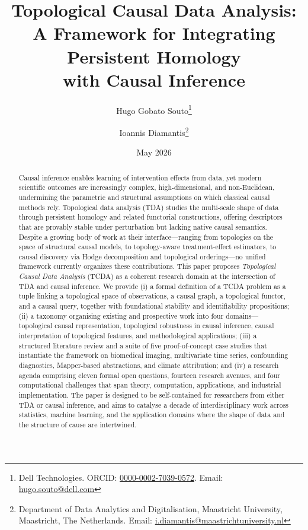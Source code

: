 \documentclass[11pt,a4paper]{article}
\title{\textbf{Topological Causal Data Analysis:\\
A Framework for Integrating Persistent Homology\\
with Causal Inference}}
\author{Hugo Gobato Souto\thanks{Dell Technologies. ORCID: \href{https://orcid.org/0000-0002-7039-0572}{0000-0002-7039-0572}. Email: \href{mailto:hugo.souto@dell.com}{hugo.souto@dell.com}} \and Ioannis Diamantis\thanks{Department of Data Analytics and Digitalisation, Maastricht University, Maastricht, The Netherlands. Email: \href{mailto:i.diamantis@maastrichtuniversity.nl}{i.diamantis@maastrichtuniversity.nl}}}
\date{May 2026}
\theoremstyle{definition}
\begin{document}
\maketitle

\begin{abstract}
Causal inference enables learning of intervention effects from data, yet modern scientific outcomes are increasingly complex, high-dimensional, and non-Euclidean, undermining the parametric and structural assumptions on which classical causal methods rely. Topological data analysis (TDA) studies the multi-scale shape of data through persistent homology and related functorial constructions, offering descriptors that are provably stable under perturbation but lacking native causal semantics.
Despite a growing body of work at their interface---ranging from topologies on the space of structural causal models, to topology-aware treatment-effect estimators, to causal discovery via Hodge decomposition and topological orderings---no unified framework currently organizes these contributions.
This paper proposes \emph{Topological Causal Data Analysis} (TCDA) as a coherent research domain at the intersection of TDA and causal inference. We provide (i) a formal definition of a TCDA problem as a tuple linking a topological space of observations, a causal graph, a topological functor, and a causal query, together with foundational stability and identifiability propositions; (ii) a taxonomy organising existing and prospective work into four domains---topological causal representation, topological robustness in causal inference, causal interpretation of topological features, and methodological applications; (iii) a structured literature review and a suite of five proof-of-concept case studies that instantiate the framework on biomedical imaging, multivariate time series, confounding diagnostics, Mapper-based abstractions, and climate attribution; and (iv) a research agenda comprising eleven formal open questions, fourteen research avenues, and four computational challenges that span theory, computation, applications, and industrial implementation.
The paper is designed to be self-contained for researchers from either TDA or causal inference, and aims to catalyse a decade of interdisciplinary work across statistics, machine learning, and the application domains where the shape of data and the structure of cause are intertwined.
\end{abstract}




\end{document}
